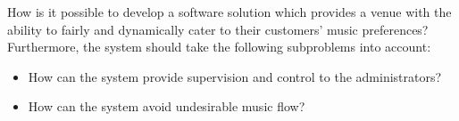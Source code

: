 How is it possible to develop a software solution which provides a venue with the ability to fairly and dynamically cater to their customers’ music preferences?\\
Furthermore, the system should take the following subproblems into account:
\begin{itemize}
\item How can the system provide supervision and control to the administrators?
\item How can the system avoid undesirable music flow?
\end{itemize}